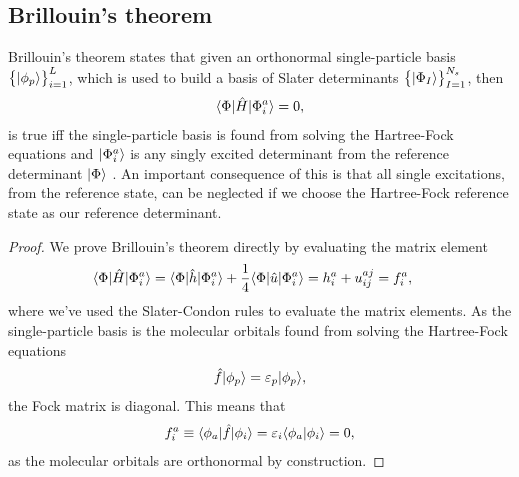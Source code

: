         \subsection{Brillouin's theorem}
            Brillouin's theorem states that given an orthonormal single-particle
            basis $\left\{ | \phi_p \rangle \right\}_{i = 1}^{L}$, which is used to build a basis of
            Slater determinants $\left\{ | \Phi_I \rangle \right\}_{I = 1}^{N_s}$, then
            \begin{align}
                \langle \Phi |\hat{H}| \Phi^{a}_{i} \rangle = 0,
            \end{align}
            is true iff the single-particle basis is found from solving the
            Hartree-Fock equations and $| \Phi^{a}_{i} \rangle$ is any singly
            excited determinant from the reference determinant $| \Phi \rangle$
            \cite{kvaal2017notes}.
            An important consequence of this is that all single excitations,
            from the reference state, can be neglected if we choose the
            Hartree-Fock reference state as our reference determinant.
            \begin{proof}
                We prove Brillouin's theorem directly by evaluating the matrix
                element
                \begin{align}
                    \langle \Phi |\hat{H}| \Phi^{a}_{i} \rangle
                    &= \langle \Phi |\hat{h}| \Phi^{a}_{i} \rangle
                    + \frac{1}{4}\langle \Phi |\hat{u}| \Phi^{a}_{i} \rangle
                    = h^{a}_{i} + u^{aj}_{ij}
                    = f^{a}_{i},
                \end{align}
                where we've used the Slater-Condon rules to evaluate the matrix
                elements.
                As the single-particle basis is the molecular orbitals found
                from solving the Hartree-Fock equations
                \begin{align}
                    \hat{f}| \phi_p \rangle = \varepsilon_p| \phi_p \rangle,
                \end{align}
                the Fock matrix is diagonal.
                This means that
                \begin{align}
                    f^{a}_{i}
                    \equiv
                    \langle \phi_a |\hat{f}| \phi_i \rangle
                    = \varepsilon_i\langle \phi_a | \phi_i \rangle
                    = 0,
                \end{align}
                as the molecular orbitals are orthonormal by construction.
            \end{proof}

